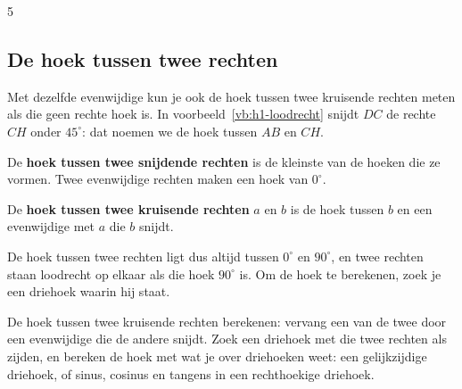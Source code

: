 \begin{alleenvoor}{5}
\subsection{De hoek tussen twee rechten}

Met dezelfde evenwijdige kun je ook de hoek tussen twee kruisende rechten meten als die geen rechte hoek is. In voorbeeld~\ref{vb:h1-loodrecht} snijdt $DC$ de rechte $CH$ onder $45^\circ$: dat noemen we de hoek tussen $AB$ en $CH$.

\begin{theorie}
De \textbf{\textcolor{accent}{hoek tussen twee snijdende rechten}} is de kleinste van de hoeken die ze vormen. Twee evenwijdige rechten maken een hoek van $0^\circ$.

De \textbf{\textcolor{accent}{hoek tussen twee kruisende rechten}} $a$ en $b$ is de hoek tussen $b$ en een evenwijdige met $a$ die $b$ snijdt.
\end{theorie}

De hoek tussen twee rechten ligt dus altijd tussen $0^\circ$ en $90^\circ$, en twee rechten staan loodrecht op elkaar als die hoek $90^\circ$ is. Om de hoek te berekenen, zoek je een driehoek waarin hij staat.


\begin{werkwijze}
De hoek tussen twee kruisende rechten berekenen: vervang een van de twee door een evenwijdige die de andere snijdt. Zoek een driehoek met die twee rechten als zijden, en bereken de hoek met wat je over driehoeken weet: een gelijkzijdige driehoek, of sinus, cosinus en tangens in een rechthoekige driehoek.
\end{werkwijze}

\begin{oefeningen}
\end{oefeningen}
\end{alleenvoor}

